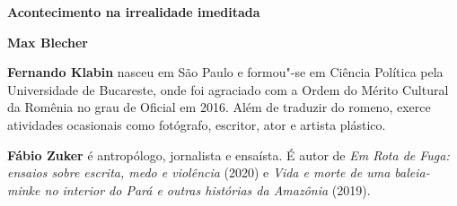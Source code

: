 \textbf{Acontecimento na irrealidade imeditada}

\textbf{Max Blecher}

\textbf{Fernando Klabin} nasceu em São Paulo e formou"-se em Ciência Política pela Universidade de Bucareste, onde foi agraciado com a Ordem do Mérito Cultural da Romênia no grau de Oficial em 2016. Além de traduzir do romeno, exerce atividades ocasionais como fotógrafo, escritor, ator e artista plástico.

\textbf{Fábio Zuker} é antropólogo, jornalista e ensaísta. É autor de \textit{Em Rota de Fuga: ensaios sobre escrita, medo e violência} (2020) e \textit{Vida e morte de uma baleia-minke no interior do Pará e outras histórias da Amazônia} (2019).

